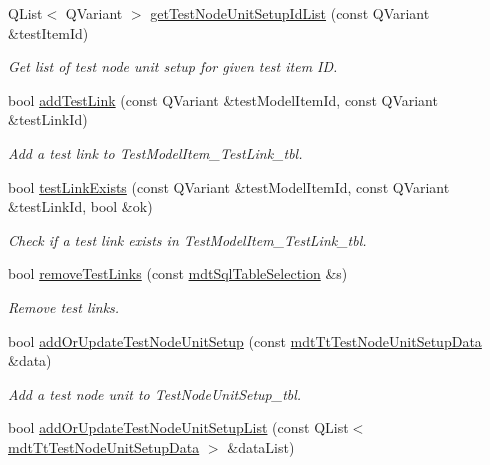 \begin{DoxyCompactItemize}
Q\-List$<$ Q\-Variant $>$ \hyperlink{classmdt_tt_test_model_item_a5db99142e311591716f80d5bf44559ad}{get\-Test\-Node\-Unit\-Setup\-Id\-List} (const Q\-Variant \&test\-Item\-Id)
\begin{DoxyCompactList}\small\item\em Get list of test node unit setup for given test item I\-D. \end{DoxyCompactList}\item 
bool \hyperlink{classmdt_tt_test_model_item_a4084538ebd5e7b4f3df1fcb97f35c86f}{add\-Test\-Link} (const Q\-Variant \&test\-Model\-Item\-Id, const Q\-Variant \&test\-Link\-Id)
\begin{DoxyCompactList}\small\item\em Add a test link to Test\-Model\-Item\-\_\-\-Test\-Link\-\_\-tbl. \end{DoxyCompactList}\item 
bool \hyperlink{classmdt_tt_test_model_item_ae01bdcd7ffb45011e4b40484085a2a46}{test\-Link\-Exists} (const Q\-Variant \&test\-Model\-Item\-Id, const Q\-Variant \&test\-Link\-Id, bool \&ok)
\begin{DoxyCompactList}\small\item\em Check if a test link exists in Test\-Model\-Item\-\_\-\-Test\-Link\-\_\-tbl. \end{DoxyCompactList}\item 
bool \hyperlink{classmdt_tt_test_model_item_ab9c5c75f887d846e6079841d08a6ec3f}{remove\-Test\-Links} (const \hyperlink{classmdt_sql_table_selection}{mdt\-Sql\-Table\-Selection} \&s)
\begin{DoxyCompactList}\small\item\em Remove test links. \end{DoxyCompactList}\item 
bool \hyperlink{classmdt_tt_test_model_item_a7aa8e5314eb09a5f56c9367c9f7eff74}{add\-Or\-Update\-Test\-Node\-Unit\-Setup} (const \hyperlink{classmdt_tt_test_node_unit_setup_data}{mdt\-Tt\-Test\-Node\-Unit\-Setup\-Data} \&data)
\begin{DoxyCompactList}\small\item\em Add a test node unit to Test\-Node\-Unit\-Setup\-\_\-tbl. \end{DoxyCompactList}\item 
bool \hyperlink{classmdt_tt_test_model_item_aebacf1463972c5eb6db1cd16eebcf7da}{add\-Or\-Update\-Test\-Node\-Unit\-Setup\-List} (const Q\-List$<$ \hyperlink{classmdt_tt_test_node_unit_setup_data}{mdt\-Tt\-Test\-Node\-Unit\-Setup\-Data} $>$ \&data\-List)

\end{DoxyCompactItemize}
